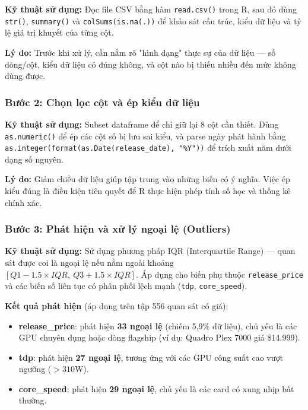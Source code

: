 \documentclass[a4paper]{article}
\begin{document}
\textbf{Kỹ thuật sử dụng:} Đọc file CSV bằng hàm \texttt{read.csv()} trong R, sau đó dùng \texttt{str()}, \texttt{summary()} và \texttt{colSums(is.na(.))} để khảo sát cấu trúc, kiểu dữ liệu và tỷ lệ giá trị khuyết của từng cột.

\textbf{Lý do:} Trước khi xử lý, cần nắm rõ "hình dạng" thực sự của dữ liệu --- số dòng/cột, kiểu dữ liệu có đúng không, và cột nào bị thiếu nhiều đến mức không dùng được.

\subsubsection{Bước 2: Chọn lọc cột và ép kiểu dữ liệu}

\textbf{Kỹ thuật sử dụng:} Subset dataframe để chỉ giữ lại 8 cột cần thiết. Dùng \texttt{as.numeric()} để ép các cột số bị lưu sai kiểu, và parse ngày phát hành bằng \texttt{as.integer(format(as.Date(release\_date), "\%Y"))} để trích xuất năm dưới dạng số nguyên.

\textbf{Lý do:} Giảm chiều dữ liệu giúp tập trung vào những biến có ý nghĩa. Việc ép kiểu đúng là điều kiện tiên quyết để R thực hiện phép tính số học và thống kê chính xác.

\subsubsection{Bước 3: Phát hiện và xử lý ngoại lệ (Outliers)}

\textbf{Kỹ thuật sử dụng:} Sử dụng phương pháp IQR (Interquartile Range) --- quan sát được coi là ngoại lệ nếu nằm ngoài khoảng $[Q1 - 1.5 \times IQR,\ Q3 + 1.5 \times IQR]$. Áp dụng cho biến phụ thuộc \texttt{release\_price} và các biến số liên tục có phân phối lệch mạnh (\texttt{tdp}, \texttt{core\_speed}).

\textbf{Kết quả phát hiện} (áp dụng trên tập 556 quan sát có giá):
\begin{itemize}
    \item \textbf{release\_price}: phát hiện \textbf{33 ngoại lệ} (chiếm 5,9\% dữ liệu), chủ yếu là các GPU chuyên dụng hoặc dòng flagship (ví dụ: Quadro Plex 7000 giá \$14.999).
    \item \textbf{tdp}: phát hiện \textbf{27 ngoại lệ}, tương ứng với các GPU công suất cao vượt ngưỡng ($>310$W).
    \item \textbf{core\_speed}: phát hiện \textbf{29 ngoại lệ}, chủ yếu là các card có xung nhịp bất thường.
\end{itemize}
\end{document}
